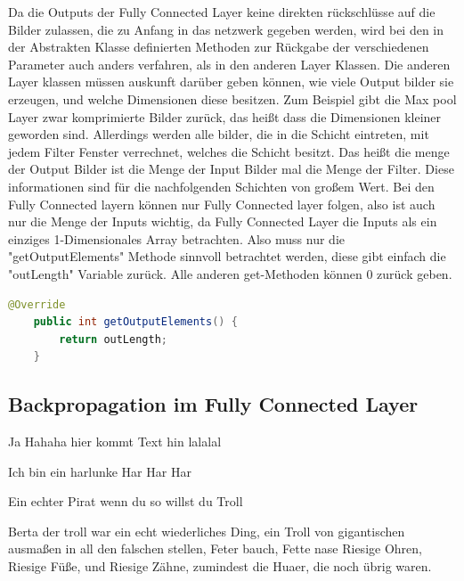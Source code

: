 \documentclass[12pt]{article}
\begin{document}
Da die Outputs der Fully Connected Layer keine direkten rückschlüsse auf die Bilder zulassen, die zu Anfang in das netzwerk gegeben werden, wird bei den in der Abstrakten Klasse definierten Methoden zur Rückgabe der verschiedenen Parameter auch anders verfahren, als in den anderen Layer Klassen. Die anderen Layer klassen müssen auskunft darüber geben können, wie viele Output bilder sie erzeugen, und welche Dimensionen diese besitzen. Zum Beispiel gibt die Max pool Layer zwar komprimierte Bilder zurück, das heißt dass die Dimensionen kleiner geworden sind. Allerdings werden alle bilder, die in die Schicht eintreten, mit jedem Filter Fenster verrechnet, welches die Schicht besitzt. Das heißt die menge der Output Bilder ist die Menge der Input Bilder mal die Menge der Filter. Diese informationen sind für die nachfolgenden Schichten von großem Wert. Bei den Fully Connected layern können nur Fully Connected layer folgen, also ist auch nur die Menge der Inputs wichtig, da Fully Connected Layer die Inputs als ein einziges 1-Dimensionales Array betrachten. Also muss nur die "getOutputElements" Methode sinnvoll betrachtet werden, diese gibt einfach die "outLength" Variable zurück. Alle anderen get-Methoden können 0 zurück geben.

\begin{lstlisting}[language=Java] 
    @Override
    public int getOutputElements() {
        return outLength;
    }
\end{lstlisting} 

\subsection{Backpropagation im Fully Connected Layer}
Ja Hahaha hier kommt Text hin lalalal

Ich bin ein harlunke Har Har Har

Ein echter Pirat wenn du so willst du Troll

Berta der troll war ein echt wiederliches Ding, ein Troll von gigantischen ausmaßen in all den falschen stellen, Feter bauch, Fette nase Riesige Ohren, Riesige Füße, und Riesige Zähne, zumindest die Huaer, die noch übrig waren.
\end{document}
